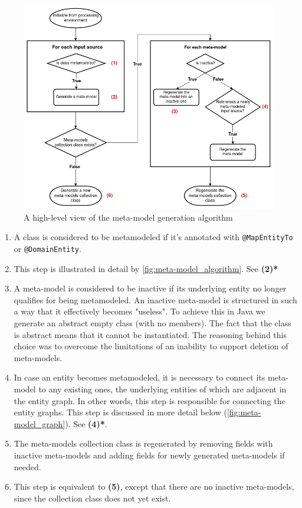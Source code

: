 \begin{figure}[H]\centering
    \includegraphics[scale=0.55]{images/algorithm.drawio.png}
    \caption{A high-level view of the meta-model generation algorithm}\label{fig:algorithm}
\end{figure}

\begin{enumerate}[label={\textbf{(\arabic*)}}]
    \item A class is considered to be metamodeled if it’s annotated with \texttt{@MapEntityTo} or \texttt{@DomainEntity}.
    \item This step is illustrated in detail by \ref{fig:meta-model_algorithm}. See \textbf{(2)*}
    \item A meta-model is considered to be inactive if its underlying entity no longer qualifies for being metamodeled. An inactive meta-model is structured in such a way that it effectively becomes "useless". To achieve this in Java we generate an abstract empty class (with no members). The fact that the class is abstract means that it cannot be instantiated. The reasoning behind this choice was to overcome the limitations of an inability to support deletion of meta-models.
    \item In case an entity becomes metamodeled, it is necessary to connect its meta-model to any existing ones, the underlying entities of which are adjacent in the entity graph. In other words, this step is responsible for connecting the entity graphs. This step is discussed in more detail below (\ref{fig:meta-model_graph}). See \textbf{(4)*}.
    \item The meta-models collection class is regenerated by removing fields with inactive meta-models and adding fields for newly generated meta-models if needed.
    \item This step is equivalent to \textbf{(5)}, except that there are no inactive meta-models, since the collection class does not yet exist.
\end{enumerate}

